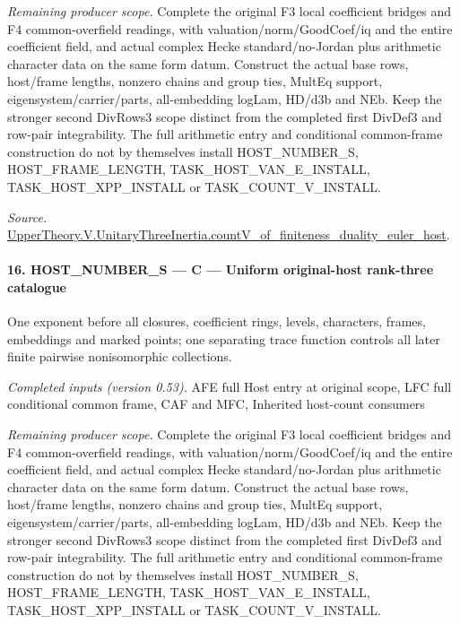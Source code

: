 \documentclass[11pt,a4paper]{article}
\numberwithin{equation}{section}
\theoremstyle{remark}\newtheorem{remark}[theorem]{Remark}
\begin{document}
\emph{Remaining producer scope.} Complete the original F3 local coefficient bridges and F4 common-overfield readings, with valuation/norm/GoodCoef/iq and the entire coefficient field, and actual complex Hecke standard/no-Jordan plus arithmetic character data on the same form datum. Construct the actual base rows, host/frame lengths, nonzero chains and group ties, MultEq support, eigensystem/carrier/parts, all-embedding logLam, HD/d3b and NEb. Keep the stronger second DivRows3 scope distinct from the completed first DivDef3 and row-pair integrability. The full arithmetic entry and conditional common-frame construction do not by themselves install HOST\_\allowbreak NUMBER\_\allowbreak S, HOST\_\allowbreak FRAME\_\allowbreak LENGTH, TASK\_\allowbreak HOST\_\allowbreak VAN\_\allowbreak E\_\allowbreak INSTALL, TASK\_\allowbreak HOST\_\allowbreak XPP\_\allowbreak INSTALL or TASK\_\allowbreak COUNT\_\allowbreak V\_\allowbreak INSTALL.

\emph{Source.} \href{https://github.com/CocoSgt/riemann-hypothesis-lean/blob/7cbf7a0c32fca1badf05931879a37c3f8a2b03b4/src/Development/AutomorphicArithmetic/AutomorphicVarieties/ModularityArgument/ThresholdArguments/DenseThresholdCases/CountVOf.lean#L33-L60}{UpperTheory.V.UnitaryThreeInertia.countV\_\allowbreak of\_\allowbreak finiteness\_\allowbreak duality\_\allowbreak euler\_\allowbreak host}.



\paragraph{16. HOST\_\allowbreak NUMBER\_\allowbreak S — C — Uniform original-host rank-three catalogue}

One exponent before all closures, coefficient rings, levels, characters, frames, embeddings and marked points; one separating trace function controls all later finite pairwise nonisomorphic collections.

\emph{Completed inputs (version 0.53).} AFE full Host entry at original scope, LFC full conditional common frame, CAF and MFC, Inherited host-count consumers

\emph{Remaining producer scope.} Complete the original F3 local coefficient bridges and F4 common-overfield readings, with valuation/norm/GoodCoef/iq and the entire coefficient field, and actual complex Hecke standard/no-Jordan plus arithmetic character data on the same form datum. Construct the actual base rows, host/frame lengths, nonzero chains and group ties, MultEq support, eigensystem/carrier/parts, all-embedding logLam, HD/d3b and NEb. Keep the stronger second DivRows3 scope distinct from the completed first DivDef3 and row-pair integrability. The full arithmetic entry and conditional common-frame construction do not by themselves install HOST\_\allowbreak NUMBER\_\allowbreak S, HOST\_\allowbreak FRAME\_\allowbreak LENGTH, TASK\_\allowbreak HOST\_\allowbreak VAN\_\allowbreak E\_\allowbreak INSTALL, TASK\_\allowbreak HOST\_\allowbreak XPP\_\allowbreak INSTALL or TASK\_\allowbreak COUNT\_\allowbreak V\_\allowbreak INSTALL.
\end{document}
